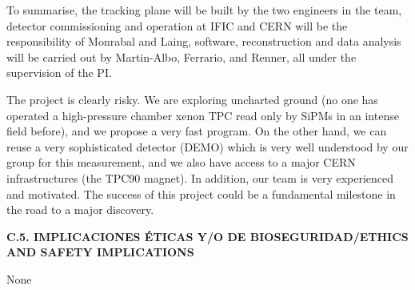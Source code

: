 \documentclass[a4paper,11pt,oneside]{article}
\begin{document}
To summarise, the tracking plane will be built by the two engineers in the team, detector commissioning and operation at IFIC and CERN will be the responsibility of Monrabal and Laing, software, reconstruction and data analysis will be carried out by Martin-Albo, Ferrario, and Renner, all under the supervision of the PI. 

The project is clearly risky. We are exploring uncharted ground (no one has operated a high-pressure chamber xenon TPC read only by SiPMs in an intense field before), and we propose a very fast program. On the other hand, we can reuse a very sophisticated detector (DEMO) which is very well understood by our group for this measurement, and we also have access to a major CERN infrastructures (the TPC90 magnet). In addition, our team is very experienced and motivated. The success of this project could be a fundamental milestone in the road to a major discovery. 
 
\vspace{12pt}

\noindent\textbf{C.5. IMPLICACIONES ÉTICAS Y/O DE BIOSEGURIDAD/ETHICS AND SAFETY IMPLICATIONS}

None
\end{document}
